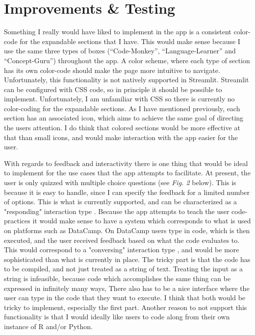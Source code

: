 \documentclass[12pt]{article}
\begin{document}
\section{Improvements \& Testing}
Something I really would have liked to implement in the app is a consistent
color-code for the expandable sections that I have. This would make sense
because I use the same three types of boxes (“Code-Monkey”, “Language-Learner” and “Concept-Guru”)
throughout the app. A color scheme, where each type of section has its own color-code
should make the page more intuitive to navigate. Unfortunately, this functionality
is not natively supported in Streamlit. Streamlit can be configured with CSS code,
so in principle it should be possible to implement. Unfortunately, I am unfamiliar
with CSS so there is currently no color-coding for the expandable sections.
As I have mentioned previously, each section has an associated icon,
which aims to achieve the same goal of directing the users attention.
I do think that colored sections would be more effective at that than small icons,
and would make interaction with the app easier for the user.

\vspace{5mm}

With regards to feedback and interactivity there is one thing that would be ideal
to implement for the use cases that the app attempts to facilitate. At present,
the user is only quizzed with multiple choice questions (see \emph{Fig. 2}
below). This is because it is easy
to handle, since I can specify the feedback for a limited number of options.
This is what is currently supported, and can be characterized as a
"responding" interaction type \autocite[81]{rogers2011interaction}.
Because the app attempts to teach the user code-practices it would make sense to
have a system which corresponds to what is used on platforms such as DataCamp.
On DataCamp users type in code, which is then executed, and the user received feedback
based on what the code evaluates to. This would correspond to a "conversing"
interaction type \autocite[81]{rogers2011interaction},
and would be more sophisticated than what is currently in
place. The tricky part is that the code has to be
compiled,
and not just treated as a string of text. Treating the input as a string
is infeasible, because code which accomplishes the same thing can be expressed in infinitely many ways,
There also has to be a nice interface where the user can type in the code that
they want to execute. I think that both would be tricky to implement, especially the
first part. Another reason to not support this functionality is that I would ideally
like users to code along from their own instance of R and/or Python.
\end{document}
